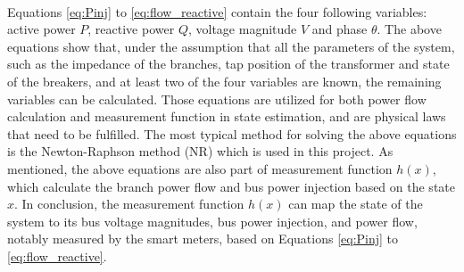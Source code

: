 \\Equations \ref{eq:Pinj} to \ref{eq:flow_reactive} contain the four following variables: active power $P$, reactive power $Q$, voltage magnitude $V$ and phase $\theta$. The above equations show that, under the assumption that all the parameters of the system, such as the impedance of the branches, tap position of the transformer and state of the breakers, and at least two of the four variables are known, the remaining variables can be calculated. Those equations are utilized for both power flow calculation and measurement function in state estimation, and are physical laws that need to be fulfilled. The most typical method for solving the above equations is the Newton-Raphson method (NR) which is used in this project. As mentioned, the above equations are also part of measurement function $h(x)$, which calculate the branch power flow and bus power injection based on the state $x$. In conclusion, the measurement function $h(x)$ can map the state of the system to its bus voltage magnitudes, bus power injection, and power flow, notably measured by the smart meters, based on Equations \ref{eq:Pinj} to \ref{eq:flow_reactive}.

